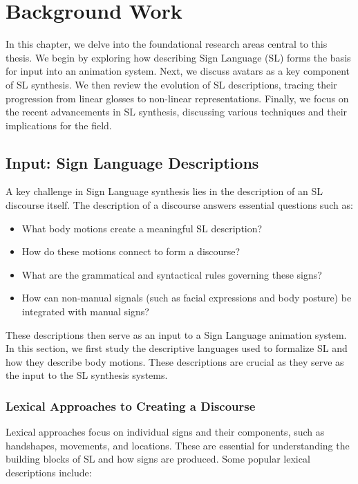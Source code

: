 \documentclass[../../main.tex]{subfiles}
\begin{document}
\chapter{Background Work}

In this chapter, we delve into the foundational research areas central to this thesis. We begin by exploring how describing Sign Language (SL) forms the basis for input into an animation system. Next, we discuss avatars as a key component of SL synthesis. We then review the evolution of SL descriptions, tracing their progression from linear glosses to non-linear representations. Finally, we focus on the recent advancements in SL synthesis, discussing various techniques and their implications for the field.

\section{Input: Sign Language Descriptions}

A key challenge in Sign Language synthesis lies in the description of an SL discourse itself. The description of a discourse answers essential questions such as:

\begin{itemize}
  \item What body motions create a meaningful SL description?
  \item How do these motions connect to form a discourse?
  \item What are the grammatical and syntactical rules governing these signs?
  \item How can non-manual signals (such as facial expressions and body posture) be integrated with manual signs?
\end{itemize}

These descriptions then serve as an input to a Sign Language animation system. In this section, we first study the descriptive languages used to formalize SL and how they describe body motions. These descriptions are crucial as they serve as the input to the SL synthesis systems.

\subsection{Lexical Approaches to Creating a Discourse}

Lexical approaches focus on individual signs and their components, such as handshapes, movements, and locations. These are essential for understanding the building blocks of SL and how signs are produced. Some popular lexical descriptions include:
\end{document}
